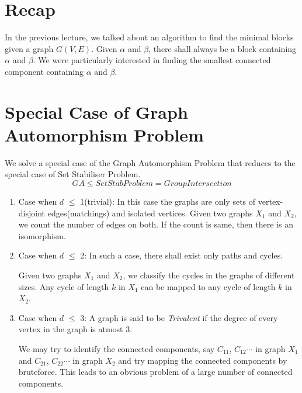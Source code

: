
\section{Recap}
In the previous lecture, we talked about an algorithm to find the minimal blocks given a graph $G(V,E)$. Given $\alpha$ and $\beta$, there shall always be a block containing $\alpha$ and $\beta$. We were particularly interested in finding the smallest connected component containing $\alpha$ and $\beta$.

\section{Special Case of Graph Automorphism Problem}
We solve a special case of the Graph Automorphism Problem that reduces to the special case of Set Stabiliser Problem. 
\[ GA \leqslant SetStab Problem = Group Intersection \]

\begin{enumerate}
	\item Case when $d$ $\leqslant$ 1(trivial): 
	In this case the graphs are only sets of vertex-disjoint edges(matchings) and isolated vertices. Given two graphs $X_1$ and $X_2$, we count the number of edges on both. If the count is same, then there is an isomorphism. 
	
	\item Case when $d$ $\leqslant$ 2:
	In such a case, there shall exist only paths and cycles.
	
	Given two graphs $X_1$ and $X_2$, we classify the cycles in the graphs of different sizes. Any cycle of length $k$ in $X_1$ can be mapped to any cycle of length $k$ in $X_2$.
	
	\item Case when $d$ $\leqslant$ 3:
A graph is said to be {\em Trivalent} if the degree of every vertex in the graph is atmost 3.

	
	We may try to identify the connected components, say $C_{11}$, $C_{12}\cdots$ in graph $X_1$ and $C_{21}$, $C_{22} \cdots$ in graph $X_2$ and try mapping the connected components by bruteforce. This leads to an obvious problem of a large number of connected components.	 
\end{enumerate}	

